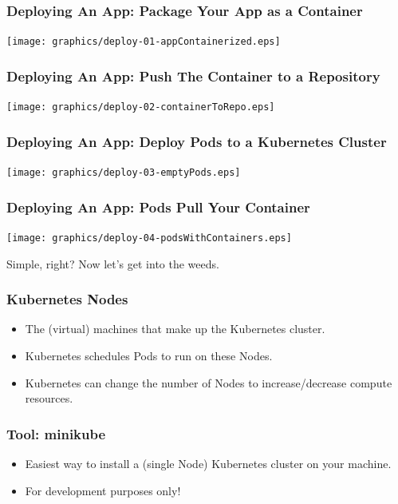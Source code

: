     \begin{frame}
        \frametitle{Deploying An App: Package Your App as a Container}
        \texttt{[image: graphics/deploy-01-appContainerized.eps]}
    \end{frame}

    \begin{frame}
        \frametitle{Deploying An App: Push The Container to a Repository}
        \texttt{[image: graphics/deploy-02-containerToRepo.eps]}
    \end{frame}

    \begin{frame}
        \frametitle{Deploying An App: Deploy Pods to a Kubernetes Cluster}
        \texttt{[image: graphics/deploy-03-emptyPods.eps]}
    \end{frame}

    \begin{frame}
        \frametitle{Deploying An App: Pods Pull Your Container}
        \texttt{[image: graphics/deploy-04-podsWithContainers.eps]}
    \end{frame}

    \begin{frame}
        \begin{center}
            \Huge Simple, right? Now let's get into the weeds.
        \end{center}
    \end{frame}

    \begin{frame}
        \frametitle{Kubernetes Nodes}
        \begin{itemize}
            \item The (virtual) machines that make up the Kubernetes cluster.\pause
            \item Kubernetes schedules Pods to run on these Nodes.\pause
            \item Kubernetes can change the number of Nodes to increase/decrease compute resources.
        \end{itemize}
    \end{frame}

    \begin{frame}
        \frametitle{Tool: minikube\footnotemark}
        \begin{itemize}
            \item Easiest way to install a (single Node) Kubernetes cluster on your machine.
            \item For development purposes only!
        \end{itemize}
    \end{frame}

